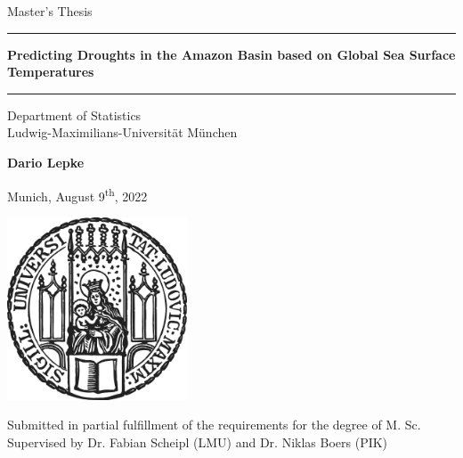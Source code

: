 \begin{titlepage}
\begin{center}

\LARGE
Master's Thesis
    
\vspace{0.5cm}
      
\rule{\textwidth}{1.5pt}
\LARGE
\textbf{Predicting Droughts in the Amazon Basin based on Global Sea Surface Temperatures}
\rule{\textwidth}{1.5pt}
   
\vspace{0.5cm}
      
\large
Department of Statistics \\
Ludwig-Maximilians-Universität München 

\vfill

\Large
\textbf{Dario Lepke}

\vfill

\large
Munich, August 9\textsuperscript{th}, 2022
      
\vfill

\includegraphics[width = 0.4\textwidth]{sigillum.png}

\vfill

\normalsize
Submitted in partial fulfillment of the requirements for the degree of M. Sc.
\\

Supervised by Dr. Fabian Scheipl (LMU) and Dr. Niklas Boers (PIK)

\end{center}
\end{titlepage}
% 